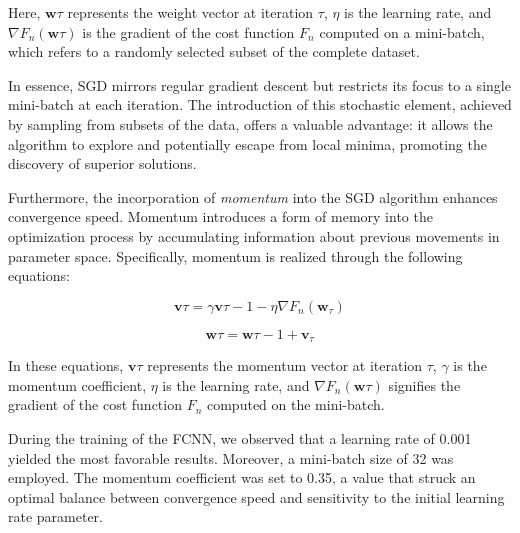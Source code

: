 \documentclass[a4paper, UKenglish, 11pt]{uiomaster}
\begin{document}
Here, $\textbf{w}{\tau}$ represents the weight vector at iteration $\tau$, $\eta$ is the learning rate, and $\nabla F_n(\textbf{w}{\tau})$ is the gradient of the cost function $F_n$ computed on a mini-batch, which refers to a randomly selected subset of the complete dataset.

In essence, SGD mirrors regular gradient descent but restricts its focus to a single mini-batch at each iteration. The introduction of this stochastic element, achieved by sampling from subsets of the data, offers a valuable advantage: it allows the algorithm to explore and potentially escape from local minima, promoting the discovery of superior solutions.

Furthermore, the incorporation of \emph{momentum} into the SGD algorithm enhances convergence speed. Momentum introduces a form of memory into the optimization process by accumulating information about previous movements in parameter space. Specifically, momentum is realized through the following equations:

\begin{equation}
\textbf{v}{\tau} = \gamma\textbf{v}{\tau-1} - \eta\nabla F_n(\textbf{w}_{\tau})
\end{equation}

\begin{equation}
\textbf{w}{\tau} = \textbf{w}{\tau-1} + \textbf{v}_{\tau}
\end{equation}

In these equations, $\textbf{v}{\tau}$ represents the momentum vector at iteration $\tau$, $\gamma$ is the momentum coefficient, $\eta$ is the learning rate, and $\nabla F_n(\textbf{w}{\tau})$ signifies the gradient of the cost function $F_n$ computed on the mini-batch.

During the training of the FCNN, we observed that a learning rate of 0.001 yielded the most favorable results. Moreover, a mini-batch size of 32 was employed. The momentum coefficient was set to 0.35, a value that struck an optimal balance between convergence speed and sensitivity to the initial learning rate parameter.
\end{document}
